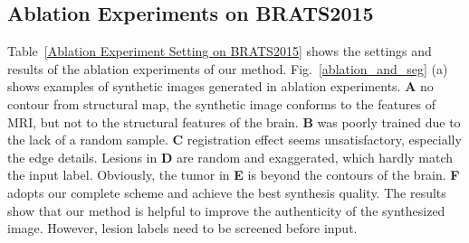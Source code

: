 \documentclass[runningheads]{llncs}
\begin{document}
	\subsection{Ablation Experiments on BRATS2015}
	Table~\ref{Ablation Experiment Setting on BRATS2015} shows the settings and results of the ablation experiments of our method.
	Fig.~\ref{ablation_and_seg} (a) shows examples of synthetic images generated in ablation experiments. 
	\textbf{A} no contour from structural map, the synthetic image conforms to the features of MRI, but not to the structural features of the brain. 
	\textbf{B} was poorly trained due to the lack of a random sample.
	\textbf{C} registration effect seems unsatisfactory, especially the edge details.
	Lesions in \textbf{D} are random and exaggerated, which hardly match the input label. 
	Obviously, the tumor in \textbf{E} is beyond the contours of the brain. 
	\textbf{F} adopts our complete scheme and achieve the best synthesis quality. The results show that our method is helpful to improve the authenticity of the synthesized image. However, lesion labels need to be screened before input.
	
\end{document}
